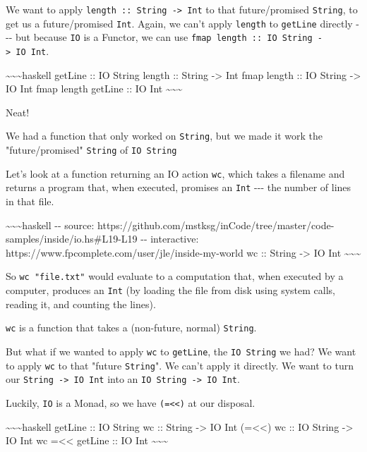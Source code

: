 \documentclass[]{article}
\begin{document}
We want to apply \texttt{length\ ::\ String\ -\textgreater{}\ Int} to that
future/promised \texttt{String}, to get us a future/promised \texttt{Int}.
Again, we can't apply \texttt{length} to \texttt{getLine} directly -\/-\/- but
because \texttt{IO} is a Functor, we can use
\texttt{fmap\ length\ ::\ IO\ String\ -\textgreater{}\ IO\ Int}.

\textasciitilde{}\textasciitilde{}\textasciitilde{}haskell getLine :: IO String
length :: String -\textgreater{} Int fmap length :: IO String -\textgreater{} IO
Int fmap length getLine :: IO Int
\textasciitilde{}\textasciitilde{}\textasciitilde{}

Neat!

We had a function that only worked on \texttt{String}, but we made it work the
"future/promised" \texttt{String} of \texttt{IO\ String}

Let's look at a function returning an IO action \texttt{wc}, which takes a
filename and returns a program that, when executed, promises an \texttt{Int}
-\/-\/- the number of lines in that file.

\textasciitilde{}\textasciitilde{}\textasciitilde{}haskell -\/- source:
https://github.com/mstksg/inCode/tree/master/code-samples/inside/io.hs\#L19-L19
-\/- interactive: https://www.fpcomplete.com/user/jle/inside-my-world wc ::
String -\textgreater{} IO Int
\textasciitilde{}\textasciitilde{}\textasciitilde{}

So \texttt{wc\ "file.txt"} would evaluate to a computation that, when executed
by a computer, produces an \texttt{Int} (by loading the file from disk using
system calls, reading it, and counting the lines).

\texttt{wc} is a function that takes a (non-future, normal) \texttt{String}.

But what if we wanted to apply \texttt{wc} to \texttt{getLine}, the
\texttt{IO\ String} we had? We want to apply \texttt{wc} to that "future
\texttt{String}". We can't apply it directly. We want to turn our
\texttt{String\ -\textgreater{}\ IO\ Int} into an
\texttt{IO\ String\ -\textgreater{}\ IO\ Int}.

Luckily, \texttt{IO} is a Monad, so we have \texttt{(=\textless{}\textless{})}
at our disposal.

\textasciitilde{}\textasciitilde{}\textasciitilde{}haskell getLine :: IO String
wc :: String -\textgreater{} IO Int (=\textless{}\textless{}) wc :: IO String
-\textgreater{} IO Int wc =\textless{}\textless{} getLine :: IO Int
\textasciitilde{}\textasciitilde{}\textasciitilde{}
\end{document}

